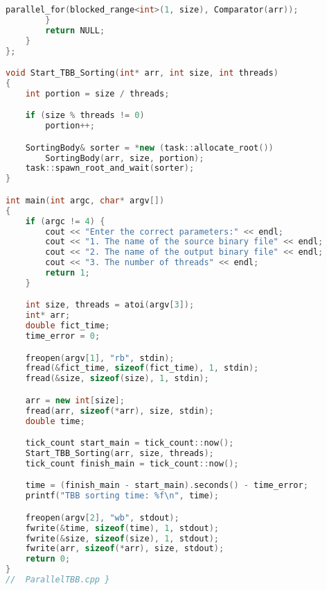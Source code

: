 \documentclass[a4paper,final]{report}
\begin{document}
\begin{spacing}{1.5}
\begin{lstlisting}[language=C++]
			parallel_for(blocked_range<int>(1, size), Comparator(arr));
		}
		return NULL;
	}
};

void Start_TBB_Sorting(int* arr, int size, int threads)
{
	int portion = size / threads;

	if (size % threads != 0)
		portion++;

	SortingBody& sorter = *new (task::allocate_root())
		SortingBody(arr, size, portion);
	task::spawn_root_and_wait(sorter);
}

int main(int argc, char* argv[])
{
	if (argc != 4) {
		cout << "Enter the correct parameters:" << endl;
		cout << "1. The name of the source binary file" << endl;
		cout << "2. The name of the output binary file" << endl;
		cout << "3. The number of threads" << endl;
		return 1;
	}

	int size, threads = atoi(argv[3]);
	int* arr;
	double fict_time;
	time_error = 0;

	freopen(argv[1], "rb", stdin);
	fread(&fict_time, sizeof(fict_time), 1, stdin);
	fread(&size, sizeof(size), 1, stdin);

	arr = new int[size];
	fread(arr, sizeof(*arr), size, stdin);
	double time;

	tick_count start_main = tick_count::now();
	Start_TBB_Sorting(arr, size, threads);
	tick_count finish_main = tick_count::now();

	time = (finish_main - start_main).seconds() - time_error;
	printf("TBB sorting time: %f\n", time);

	freopen(argv[2], "wb", stdout);
	fwrite(&time, sizeof(time), 1, stdout);
	fwrite(&size, sizeof(size), 1, stdout);
	fwrite(arr, sizeof(*arr), size, stdout);
	return 0;
}
//  ParallelTBB.cpp }
\end{lstlisting} 
		
		
	\end{spacing}
	
\end{document}
